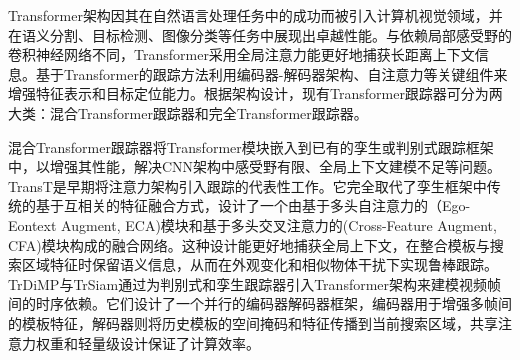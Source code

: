 
Transformer\cite{vaswani2017attention}架构因其在自然语言处理任务中的成功而被引入计算机视觉领域，并在语义分割、目标检测、图像分类等任务中展现出卓越性能。与依赖局部感受野的卷积神经网络不同，Transformer采用全局注意力能更好地捕获长距离上下文信息。基于Transformer的跟踪方法利用编码器-解码器架构、自注意力等关键组件来增强特征表示和目标定位能力。根据架构设计，现有Transformer跟踪器可分为两大类：混合Transformer跟踪器和完全Transformer跟踪器。

混合Transformer跟踪器将Transformer模块嵌入到已有的孪生或判别式跟踪框架中\cite{JSJA2023S1054}，以增强其性能，解决CNN架构中感受野有限、全局上下文建模不足等问题。TransT\cite{Chen2021TransT}是早期将注意力架构引入跟踪的代表性工作。它完全取代了孪生框架中传统的基于互相关的特征融合方式，设计了一个由基于多头自注意力的（Ego-Eontext Augment, ECA)模块和基于多头交叉注意力的(Cross-Feature Augment, CFA)模块构成的融合网络。这种设计能更好地捕获全局上下文，在整合模板与搜索区域特征时保留语义信息，从而在外观变化和相似物体干扰下实现鲁棒跟踪。TrDiMP与TrSiam\cite{Wang2021TransformerTracker}通过为判别式和孪生跟踪器引入Transformer架构来建模视频帧间的时序依赖。它们设计了一个并行的编码器解码器框架，编码器用于增强多帧间的模板特征，解码器则将历史模板的空间掩码和特征传播到当前搜索区域，共享注意力权重和轻量级设计保证了计算效率。

